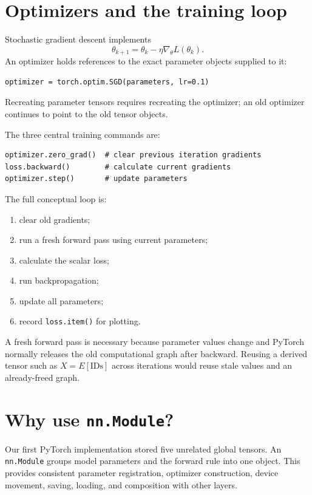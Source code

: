 \documentclass[11pt]{article}
\newcommand{\grad}{\nabla}
\begin{document}
\section{Optimizers and the training loop}

Stochastic gradient descent implements
\[
\theta_{k+1}=\theta_k-\eta\grad_\theta L(\theta_k).
\]
An optimizer holds references to the exact parameter objects supplied to it:
\begin{lstlisting}
optimizer = torch.optim.SGD(parameters, lr=0.1)
\end{lstlisting}
Recreating parameter tensors requires recreating the optimizer; an old optimizer continues to point to
the old tensor objects.

The three central training commands are:
\begin{lstlisting}
optimizer.zero_grad()  # clear previous iteration gradients
loss.backward()        # calculate current gradients
optimizer.step()       # update parameters
\end{lstlisting}

The full conceptual loop is:
\begin{enumerate}
\item clear old gradients;
\item run a fresh forward pass using current parameters;
\item calculate the scalar loss;
\item run backpropagation;
\item update all parameters;
\item record \texttt{loss.item()} for plotting.
\end{enumerate}

A fresh forward pass is necessary because parameter values change and PyTorch normally releases the old
computational graph after backward. Reusing a derived tensor such as $X=E[\text{IDs}]$ across iterations
would reuse stale values and an already-freed graph.

\section{Why use \texttt{nn.Module}?}

Our first PyTorch implementation stored five unrelated global tensors. An \texttt{nn.Module} groups model
parameters and the forward rule into one object. This provides consistent parameter registration, optimizer
construction, device movement, saving, loading, and composition with other layers.
\end{document}
